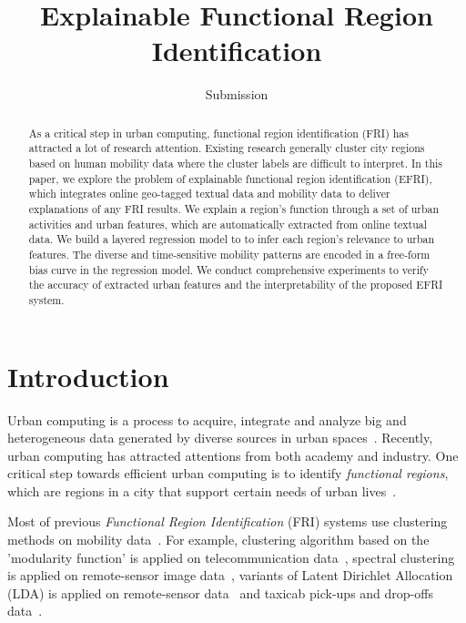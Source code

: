 \documentclass[runningheads]{llncs}
\begin{document}
\title{Explainable Functional Region Identification}
\author{Submission}

\maketitle

\begin{abstract}
As a critical step in urban computing, functional region identification (FRI) has attracted a lot of research attention.
Existing research generally cluster city regions based on human mobility data where the cluster labels are difficult to interpret.
In this paper, we explore the problem of explainable functional region identification (EFRI), which integrates online geo-tagged textual data and mobility data to deliver explanations of any FRI results. 
We  explain a region's function through a set of urban activities and urban features, which are automatically extracted from online textual data.
We  build a layered regression model to to infer each region's relevance to urban features. The diverse and time-sensitive mobility patterns are encoded in a free-form bias curve in the regression model.
We conduct comprehensive experiments to verify the accuracy of extracted urban features and the interpretability of the proposed EFRI system.

\end{abstract}
%


\section{Introduction}
Urban computing is a process to acquire, integrate and analyze big and heterogeneous data generated by diverse sources in urban spaces~\cite{Zheng2014UrbanConcepts}. 
Recently, urban computing has attracted attentions from both academy and industry.
One critical step towards efficient urban computing is to identify \emph{functional regions}, which are regions in a city that support certain needs of urban lives~\cite{Yuan2012FunctionRegion,Yuan2015FunctionRegion}.

Most of previous \emph{Functional Region Identification} (FRI) systems use clustering methods on mobility data~\cite{Karlsson2006FunctionalRegionSummary}.
For example, clustering algorithm based on the 'modularity function' is applied on telecommunication data~\cite{Newman2004ModularityFunction,Ratti2010Telecom}, spectral clustering is applied on remote-sensor image data~\cite{Vatsavai2011Remote}, variants of Latent Dirichlet Allocation (LDA) is applied on remote-sensor data~\cite{Vatsavai2010Remote} and taxicab pick-ups and drop-offs data~\cite{Yuan2012FunctionRegion,Yuan2015FunctionRegion}.
\end{document}
